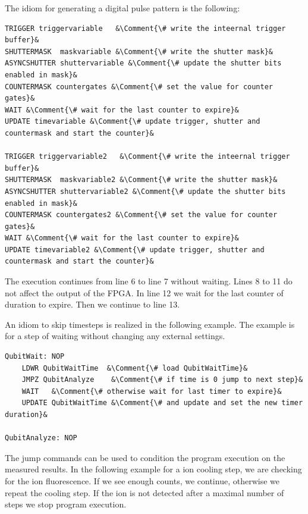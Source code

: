 \documentclass[11pt]{scrartcl}
\begin{document}
The idiom for generating a digital pulse pattern is the following:
\begin{lstlisting}
TRIGGER triggervariable   &\Comment{\# write the inteernal trigger buffer}&
SHUTTERMASK  maskvariable &\Comment{\# write the shutter mask}&
ASYNCSHUTTER shuttervariable &\Comment{\# update the shutter bits enabled in mask}&
COUNTERMASK countergates &\Comment{\# set the value for counter gates}&
WAIT &\Comment{\# wait for the last counter to expire}&
UPDATE timevariable &\Comment{\# update trigger, shutter and countermask and start the counter}&

TRIGGER triggervariable2   &\Comment{\# write the inteernal trigger buffer}&
SHUTTERMASK  maskvariable2 &\Comment{\# write the shutter mask}&
ASYNCSHUTTER shuttervariable2 &\Comment{\# update the shutter bits enabled in mask}&
COUNTERMASK countergates2 &\Comment{\# set the value for counter gates}&
WAIT &\Comment{\# wait for the last counter to expire}&
UPDATE timevariable2 &\Comment{\# update trigger, shutter and countermask and start the counter}&
\end{lstlisting}

The execution continues from line 6 to line 7 without waiting. Lines 8 to 11 do not affect the output of the FPGA. In line 12 we wait for the last counter of duration  to expire. Then we continue to line 13.

An idiom to skip timesteps is realized in the following example. The example is for a step of waiting without changing any external settings.
\begin{lstlisting}
QubitWait: NOP	
	LDWR QubitWaitTime  &\Comment{\# load QubitWaitTime}&
	JMPZ QubitAnalyze    &\Comment{\# if time is 0 jump to next step}&
	WAIT   &\Comment{\# otherwise wait for last timer to expire}&
	UPDATE QubitWaitTime &\Comment{\# and update and set the new timer duration}&

QubitAnalyze: NOP
\end{lstlisting}

The jump commands can be used to condition the program execution on the measured results. In the following example for a ion cooling step, we are checking for the ion fluorescence. If we see enough counts, we continue, otherwise we repeat the cooling step. If the ion is not detected after a maximal number of steps we stop program execution.
\end{document}
